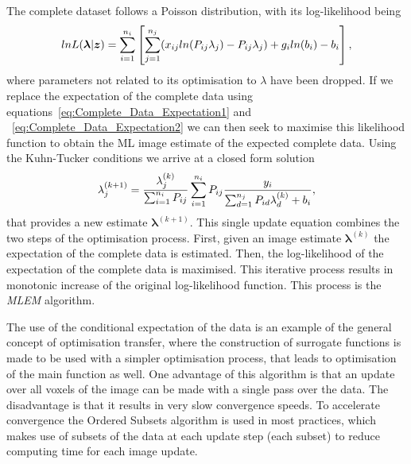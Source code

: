 The complete dataset follows a Poisson distribution, with its log-likelihood being
\begin{equation}
lnL(\bm{\lambda}|\bm{z}) = 
\sum_{i=1}^{n_i} \left[\sum_{j=1}^{n_j}( x_{ij} ln(P_{ij}\lambda_j) - P_{ij} \lambda_j) +
g_i ln(b_i) - b_i \right] \\ ,  
\label{eqn:log_likelihood_z}
\end{equation}
where parameters not related to its optimisation to $\lambda$ have been dropped. 
If we replace the expectation of the complete data using equations~\ref{eq:Complete_Data_Expectation1} and ~\ref{eq:Complete_Data_Expectation2} we can then seek to maximise this likelihood function to obtain the ML image estimate of the expected complete data. Using the Kuhn-Tucker conditions we arrive at a closed form solution
\begin{equation}
\lambda_j^{(k+1)} = \frac{\lambda_j^{(k)}}{\sum_{i=1}^{n_i} P_{ij}} 
\sum_{i=1}^{n_i} P_{ij} 
\frac{y_i}{\sum_{d=1}^{n_j} P_{id}\lambda_d^{(k)} + b_i } \\,
\label{eqn:MLEM}
\end{equation} 
that provides a new estimate $\bm{\lambda}^{(k+1)}$. This single update equation combines the two steps of the optimisation process. First, given an image estimate $\bm{\lambda}^{(k)}$ the expectation of the complete data is estimated. Then, the log-likelihood of the expectation of the complete data is maximised. This iterative process results in monotonic increase of the original log-likelihood function. This process is the \textit{MLEM} algorithm.

The use of the conditional expectation of the data is an example of the general concept of optimisation transfer, where the construction of surrogate functions is made to be used with a simpler optimisation process, that leads to optimisation of the main function as well. One advantage of this algorithm is that an update over all voxels of the image can be made with a single pass over the data. The disadvantage is that it results in very slow convergence speeds. 
To accelerate convergence the Ordered Subsets algorithm is used in most practices, which makes use of subsets of the data at each update step (each subset) to reduce computing time for each image update. 

